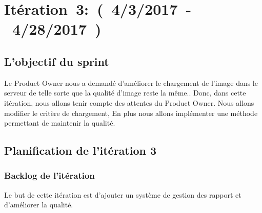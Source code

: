 \section{Itération~3:~(~4/3/2017~-~4/28/2017~)}

\subsection{L'objectif du sprint}
Le Product Owner nous a demandé d’améliorer le chargement de l'image
dans le serveur de telle sorte que la qualité d'image reste la même..
Donc, dans cette itération, nous allons tenir compte des attentes du Product Owner. Nous allons
modifier le critère de chargement, En plus nous allons implémenter une méthode
permettant de maintenir la qualité.

\subsection{Planification de l'itération 3}

\subsubsection{Backlog de l'itération}

Le but de cette itération est d'ajouter un système de gestion des rapport et d'améliorer
la qualité.

